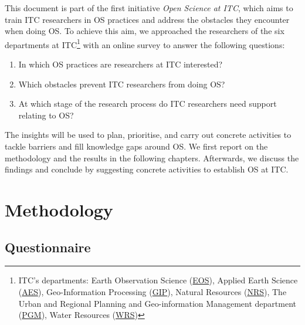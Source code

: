 \documentclass[gc, manuscript]{copernicus}
\begin{document}
This document is part of the first initiative
\textit{Open Science at ITC}, which aims to train ITC researchers in OS
practices and address the obstacles they encounter when doing OS. To
achieve this aim, we approached the researchers of the six departments
at ITC\footnote{ITC's departments: Earth Observation Science
  (\href{https://www.itc.nl/about-itc/organization/scientific-departments/earth-observation-science/profile/}{EOS}),
  Applied Earth Science
  (\href{https://www.itc.nl/about-itc/organization/scientific-departments/earth-systems-analysis/}{AES}),
  Geo-Information Processing
  (\href{https://www.itc.nl/about-itc/organization/scientific-departments/geo-information-processing/}{GIP}),
  Natural Resources
  (\href{https://www.itc.nl/about-itc/organization/scientific-departments/natural-resources/profile/}{NRS}),
  The Urban and Regional Planning and Geo-information Management
  department
  (\href{https://www.itc.nl/about-itc/organization/scientific-departments/urban-regional-planning-geo-information-management/profile/}{PGM}),
  Water Resources
  (\href{https://www.itc.nl/about-itc/organization/scientific-departments/water-resources/profile/}{WRS})}
with an online survey to answer the following questions:

\begin{enumerate}
\def\labelenumi{\arabic{enumi}.}
\item
  In which OS practices are researchers at ITC interested?
\item
  Which obstacles prevent ITC researchers from doing OS?
\item
  At which stage of the research process do ITC researchers need support
  relating to OS?
\end{enumerate}

The insights will be used to plan, prioritise, and carry out concrete
activities to tackle barriers and fill knowledge gaps around OS. We
first report on the methodology and the results in the following
chapters. Afterwards, we discuss the findings and conclude by suggesting
concrete activities to establish OS at ITC.

\section{Methodology}

\subsection{Questionnaire}
\end{document}
